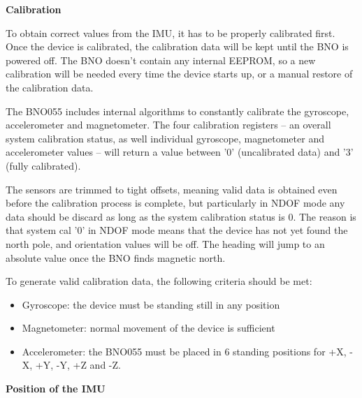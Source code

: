 \textbf{Calibration}

To obtain correct values from the IMU, it has to be properly calibrated first. Once the device is calibrated, the calibration data will be kept until the BNO is powered off. The BNO doesn't contain any internal EEPROM, so a new calibration will be needed every time the device starts up, or a manual restore of the calibration data.

The BNO055 includes internal algorithms to constantly calibrate the gyroscope, accelerometer and magnetometer. The four calibration registers -- an overall system calibration status, as well individual gyroscope, magnetometer and accelerometer values -- will return a value between '0' (uncalibrated data) and '3' (fully calibrated).

The sensors are trimmed to tight offsets, meaning valid data is obtained even before the calibration process is complete, but particularly in NDOF mode any data should be discard as long as the system calibration status is 0. The reason is that system cal '0' in NDOF mode means that the device has not yet found the north pole, and orientation values will be off. The heading will jump to an absolute value once the BNO finds magnetic north.

To generate valid calibration data, the following criteria should be met:
\begin{itemize}
\begin{itemize}\itemsep -10pt
\item Gyroscope: the device must be standing still in any position
\item Magnetometer: normal movement of the device is sufficient
\item Accelerometer: the BNO055 must be placed in 6 standing positions for +X, -X, +Y, -Y, +Z and -Z.
\end{itemize}
\end{itemize}

\textbf{Position of the IMU}

